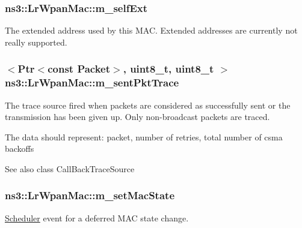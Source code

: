 \subsubsection[{\texorpdfstring{m\+\_\+self\+Ext}{m_selfExt}}]{ ns3\+::\+Lr\+Wpan\+Mac\+::m\+\_\+self\+Ext\hspace{0.3cm}{\ttfamily [private]}}\hypertarget{classns3_1_1LrWpanMac_ad519d2851f7d2e15c5cbc8c9bdee3f97}{}\label{classns3_1_1LrWpanMac_ad519d2851f7d2e15c5cbc8c9bdee3f97}
The extended address used by this M\+AC. Extended addresses are currently not really supported. 
\subsubsection[{\texorpdfstring{m\+\_\+sent\+Pkt\+Trace}{m_sentPktTrace}}]{$<${\bf Ptr}$<$const {\bf Packet}$>$, uint8\+\_\+t, uint8\+\_\+t $>$ ns3\+::\+Lr\+Wpan\+Mac\+::m\+\_\+sent\+Pkt\+Trace\hspace{0.3cm}{\ttfamily [private]}}\hypertarget{classns3_1_1LrWpanMac_ac389be9d8b495db627c8f1b8036054cb}{}\label{classns3_1_1LrWpanMac_ac389be9d8b495db627c8f1b8036054cb}
The trace source fired when packets are considered as successfully sent or the transmission has been given up. Only non-\/broadcast packets are traced.

The data should represent\+: packet, number of retries, total number of csma backoffs

\begin{DoxySeeAlso}{See also}
class Call\+Back\+Trace\+Source 
\end{DoxySeeAlso}
\subsubsection[{\texorpdfstring{m\+\_\+set\+Mac\+State}{m_setMacState}}]{ ns3\+::\+Lr\+Wpan\+Mac\+::m\+\_\+set\+Mac\+State\hspace{0.3cm}{\ttfamily [private]}}\hypertarget{classns3_1_1LrWpanMac_a764e1cada16e9fc51d9863963d962823}{}\label{classns3_1_1LrWpanMac_a764e1cada16e9fc51d9863963d962823}
\hyperlink{classns3_1_1Scheduler}{Scheduler} event for a deferred M\+AC state change. 
